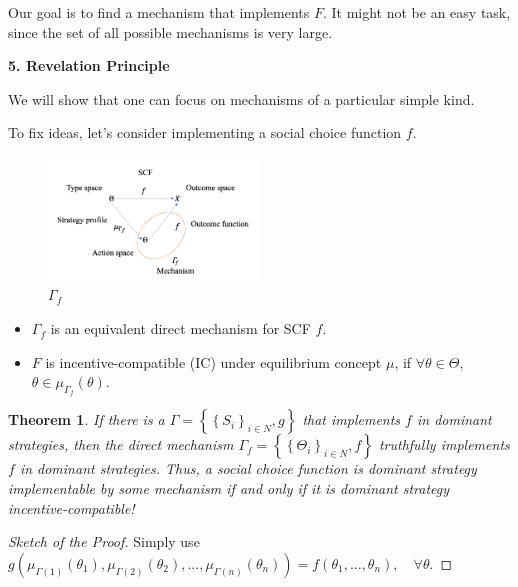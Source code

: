 \documentclass[11pt,leqno]{article}
\newtheorem{theorem}{Theorem}
\begin{document}
Our goal is to find a mechanism that implements $F$. It might not be an easy task, since the set of all possible mechanisms is very large.

\textbf{5. Revelation Principle}

We will show that one can focus on mechanisms of a particular simple kind.

To fix ideas, let's consider implementing a social choice function $f$. 

\begin{figure}[h]
    \centering
    \includegraphics[width=0.5\textwidth]{figure 3.png}
    \caption{$\Gamma_{f}$}
    \label{fig:3}
\end{figure}

\begin{itemize}
    \item $\Gamma_{f}$ is an equivalent direct mechanism for SCF $f$.
    \item $F$ is incentive-compatible (IC) under equilibrium concept $\mu$, if $\forall \theta\in \Theta$, $\theta\in \mu_{\Gamma_{f}}(\theta)$.
\end{itemize}


\begin{theorem}
If there is a $\Gamma=\left\{\left\{S_{i}\right\}_{i\in N}, g\right\}$ that implements $f$ in dominant strategies, then the direct mechanism $\Gamma_{f}=\left\{\left\{\Theta_{i}\right\}_{i\in N}, f\right\}$ truthfully implements $f$ in dominant strategies. Thus, a social choice function is dominant strategy implementable by some mechanism if and only if it is dominant strategy incentive-compatible!
\end{theorem}
\begin{proof}[Sketch of the Proof]
    Simply use $g(\mu_{\Gamma (1)}(\theta_{1}), \mu_{\Gamma (2)}(\theta_{2}),..., \mu_{\Gamma (n)}(\theta_{n}))=f(\theta_{1},...,\theta_{n}), \quad \forall \theta$. 
\end{proof}
\end{document}
